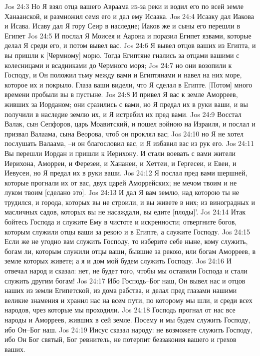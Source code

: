 Jos 24:3  Но Я взял отца вашего Авраама из-за реки и водил его по всей земле Ханаанской, и размножил семя его и дал ему Исаака.
Jos 24:4  Исааку дал Иакова и Исава. Исаву дал Я гору Сеир в наследие; Иаков же и сыны его перешли в Египет
Jos 24:5  И послал Я Моисея и Аарона и поразил Египет язвами, которые делал Я среди его, и потом вывел вас.
Jos 24:6  Я вывел отцов ваших из Египта, и вы пришли к [Чермному] морю. Тогда Египтяне гнались за отцами вашими с колесницами и всадниками до Чермного моря;
Jos 24:7  но они возопили к Господу, и Он положил тьму между вами и Египтянами и навел на них море, которое их и покрыло. Глаза ваши видели, что Я сделал в Египте. [Потом] много времени пробыли вы в пустыне.
Jos 24:8  И привел Я вас к земле Аморреев, живших за Иорданом; они сразились с вами, но Я предал их в руки ваши, и вы получили в наследие землю их, и Я истребил их пред вами.
Jos 24:9  Восстал Валак, сын Сепфоров, царь Моавитский, и пошел войною на Израиля, и послал и призвал Валаама, сына Веорова, чтоб он проклял вас;
Jos 24:10  но Я не хотел послушать Валаама, --и он благословил вас, и Я избавил вас из рук его.
Jos 24:11  Вы перешли Иордан и пришли к Иерихону. И стали воевать с вами жители Иерихона, Аморреи, и Ферезеи, и Хананеи, и Хеттеи, и Гергесеи, и Евеи, и Иевусеи, но Я предал их в руки ваши.
Jos 24:12  Я послал пред вами шершней, которые прогнали их от вас, двух царей Аморрейских; не мечом твоим и не луком твоим [сделано это].
Jos 24:13  И дал Я вам землю, над которою ты не трудился, и города, которых вы не строили, и вы живете в них; из виноградных и масличных садов, которых вы не насаждали, вы едите [плоды]'.
Jos 24:14  Итак бойтесь Господа и служите Ему в чистоте и искренности; отвергните богов, которым служили отцы ваши за рекою и в Египте, а служите Господу.
Jos 24:15  Если же не угодно вам служить Господу, то изберите себе ныне, кому служить, богам ли, которым служили отцы ваши, бывшие за рекою, или богам Аморреев, в земле которых живете; а я и дом мой будем служить Господу.
Jos 24:16  И отвечал народ и сказал: нет, не будет того, чтобы мы оставили Господа и стали служить другим богам!
Jos 24:17  Ибо Господь--Бог наш, Он вывел нас и отцов наших из земли Египетской, из дома рабства, и делал пред глазами нашими великие знамения и хранил нас на всем пути, по которому мы шли, и среди всех народов, чрез которые мы проходили.
Jos 24:18  Господь прогнал от нас все народы и Аморреев, живших в сей земле. Посему и мы будем служить Господу, ибо Он--Бог наш.
Jos 24:19  Иисус сказал народу: не возможете служить Господу, ибо Он Бог святый, Бог ревнитель, не потерпит беззакония вашего и грехов ваших.

